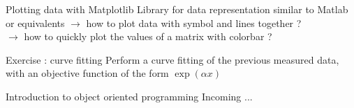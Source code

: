 \documentclass[11pt,unknownkeysallowed,usenames,dvipsnames]{beamer}
\begin{document}
\begin{frame}{Plotting data with Matplotlib}
Library for data representation similar to Matlab or equivalents
\vspace*{-5pt}\pythonCode\vspace*{-20pt}
$\rightarrow$ how to plot data with symbol and lines together ?\\
$\rightarrow$ how to quickly plot the values of a matrix with colorbar ?
\end{frame}

\begin{frame}{Exercise : curve fitting}
Perform a curve fitting of the previous measured data, with an objective function of the form $\exp(\alpha x)$\pause
\vspace*{-5pt}\pythonCode
\end{frame}

\begin{frame}{Introduction to object oriented programming}
Incoming ...
\end{frame}
\end{document}
